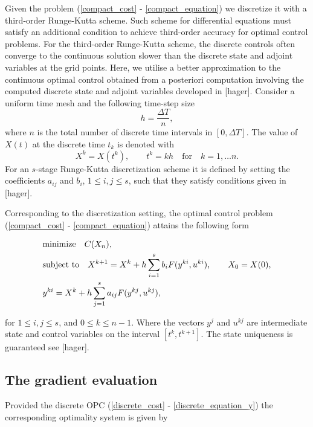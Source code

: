 \documentclass[a4paper,10pt, english]{article}
\newcommand{\D}{\displaystyle}
\begin{document}
  Given the problem (\ref{compact_cost} - \ref{compact_equation}) we discretize it with a third-order Runge-Kutta scheme. Such scheme for differential equations  must satisfy an additional condition to achieve third-order accuracy
  for optimal control problems. For the third-order Runge-Kutta scheme, the discrete controls often converge to the continuous solution slower than the discrete state and adjoint variables at the grid points. Here, we utilise a better approximation to the continuous optimal control obtained from a posteriori computation involving the computed discrete state and adjoint variables  developed in [hager]. 
  Consider a uniform time mesh and the following time-step size
 \begin{equation}
   h = \frac{\Delta T}{n},
   \label{h}
 \end{equation}
 where $n$ is the total number of discrete time intervals in $[0, \Delta T]$.  The value of $X(t)$ at the discrete time $t_k$ is denoted with
 $$
 X^k = X(t^k), \qquad t^k = kh \quad\mbox{for} \quad k = 1, \dots n.
 $$
 For an $s$-stage Runge-Kutta discretization scheme it is defined by setting the coefficients $a_{ij}$ and
 $b_{i}$, $1\leq i, j\leq s$, such that they satisfy conditions given in [hager]. 
 
 Corresponding to the discretization setting, the optimal control problem (\ref{compact_cost} -  \ref{compact_equation})  attains the following form
 
 \begin{align}
  \D
  & \mbox{minimize}\quad C(X_n), \label{discrete_cost}\\
  & \mbox{subject to} \quad X^{k+1}  = X^k + h\sum_{i=1}^{s}b_iF(y^{ki}, u^{ki}), \qquad X_0 = X(0), \label{discrete_equation_x}\\
  & y^{ki} = X^k + h\sum_{j=1}^{s}a_{ij}F(y^{kj}, u^{kj}),\label{discrete_equation_y}
  \end{align}
 
 for $1\leq i, j\leq s$, and $0\leq k\leq n-1$.
 Where the vectors $y^j$ and $u^{kj}$ are intermediate state and control variables on the interval $[t^k, t^{k+1}]$. The state uniqueness is guaranteed see [hager]. 
 
 
 

\newpage
\subsection{The gradient evaluation}
Provided the discrete OPC (\ref{discrete_cost} - \ref{discrete_equation_y}) the corresponding  optimality system  is given by
\end{document}
